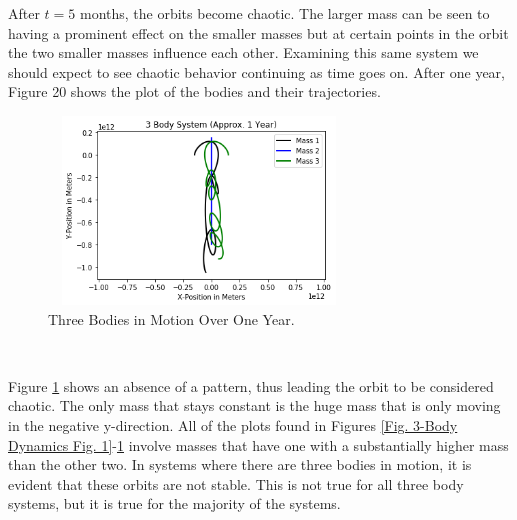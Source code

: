 \documentclass[twocolumn]{article}
\begin{document}
\par \noindent
After $t=5$ months, the orbits become chaotic. The larger mass can be seen to having a prominent effect on the smaller masses but at certain points in the orbit the two smaller masses influence each other. Examining this same system we should expect to see chaotic behavior continuing as time goes on. After one year, Figure 20 shows the plot of the bodies and their trajectories.
\begin{figure}[ht]
    \centering
    \includegraphics[width=8cm, height=5cm]{Figures/3-Body Dynamics (8).png}
    \caption{\small{Three Bodies in Motion Over One Year.}}
    \label{Fig. 3-Body Dynamics Fig. 8}
\end{figure}\
\par \noindent
Figure \ref{Fig. 3-Body Dynamics Fig. 8} shows an absence of a pattern, thus leading the orbit to be considered chaotic. The only mass that stays constant is the huge mass that is only moving in the negative y-direction. All of the plots found in Figures \ref{Fig. 3-Body Dynamics Fig. 1}-\ref{Fig. 3-Body Dynamics Fig. 8} involve masses that have one with a substantially higher mass than the other two. In systems where there are three bodies in motion, it is evident that these orbits are not stable. This is not true for all three body systems, but it is true for the majority of the systems. 
\end{document}
